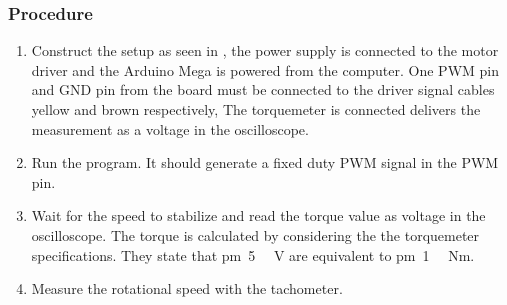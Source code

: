 \subsubsection{Procedure}
\begin{enumerate}
	\item Construct the setup as seen in , the power supply is connected to the motor driver and the Arduino Mega is powered from the computer. One PWM pin and GND pin from the board must be connected to the driver signal cables yellow and brown respectively, The torquemeter is connected delivers the measurement as a voltage in the oscilloscope. 
	\item Run the program. It should generate a fixed duty PWM signal in the PWM pin.
	\item Wait for the speed to stabilize and read the torque value as voltage in the oscilloscope. The torque is calculated by considering the the torquemeter specifications. They state that \si{\pm5\textbf{ }V} are equivalent to \si{\pm1\textbf{ }Nm}.
	\item Measure the rotational speed with the tachometer.
\end{enumerate}


